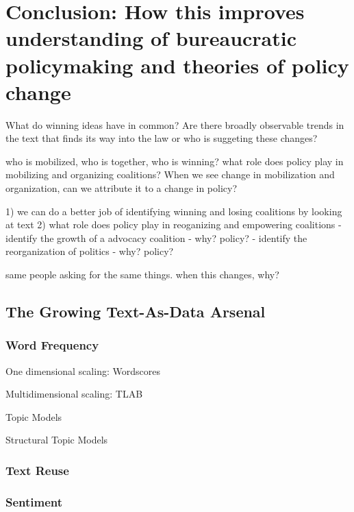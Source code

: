 \section{Conclusion: How this improves understanding of bureaucratic policymaking and theories of policy change}







What do winning ideas have in common? Are there broadly observable trends in the text that finds its way into the law or who is suggeting these changes? 

who is mobilized, who is together, who is winning? what role does policy play in mobilizing and organizing coalitions? When we see change in mobilization and organization, can we attribute it to a change in policy? 

1) we can do a better job of identifying winning and losing coalitions  by looking at text
2) what role does policy play in reoganizing and empowering coalitions 
- identify the growth of a advocacy coalition - why? policy?
- identify the reorganization of politics - why? policy?

same people asking for the same things. when this changes, why? 




\subsection{The Growing Text-As-Data Arsenal}

\subsubsection{Word Frequency}

One dimensional scaling: Wordscores

Multidimensional scaling: TLAB

Topic Models

Structural Topic Models

\subsubsection{Text Reuse}

\subsubsection{Sentiment}



